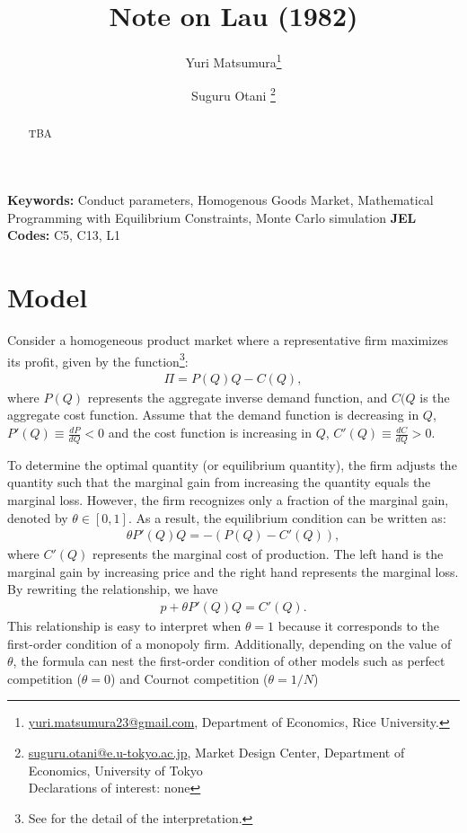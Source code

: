 \documentclass[11pt, a4paper]{article}
\title{Note on Lau (1982)}
\author{Yuri Matsumura\thanks{\href{mailto:}{yuri.matsumura23@gmail.com}, Department of Economics, Rice University.} \and Suguru Otani \thanks{\href{mailto:}{suguru.otani@e.u-tokyo.ac.jp}, Market Design Center, Department of Economics, University of Tokyo
\\Declarations of interest: none %
}}
\theoremstyle{remark}
\begin{document}
\maketitle
\begin{abstract}
    TBA
\end{abstract}

\noindent\textbf{Keywords:} Conduct parameters, Homogenous Goods Market, Mathematical Programming with Equilibrium Constraints, Monte Carlo simulation
\vspace{0in}
\newline
\noindent\textbf{JEL Codes:} C5, C13, L1

\bigskip

\section{Model}
Consider a homogeneous product market where a representative firm maximizes its profit, given by the function\footnote{See \citet{adachiMicrofoundation2023} for the detail of the interpretation.}:
\begin{align}
    \Pi = P(Q)Q - C(Q),
\end{align}
where $P(Q)$ represents the aggregate inverse demand function, and $C(Q$ is the aggregate cost function.
Assume that the demand function is decreasing in $Q$, $P'(Q) \equiv \frac{dP}{dQ} < 0$ and the cost function is increasing in $Q$, $C'(Q) \equiv \frac{dC}{dQ} > 0$.

To determine the optimal quantity (or equilibrium quantity), the firm adjusts the quantity such that the marginal gain from increasing the quantity equals the marginal loss. 
However, the firm recognizes only a fraction of the marginal gain, denoted by $\theta \in [0,1]$. 
As a result, the equilibrium condition can be written as:
\begin{align}
    \theta P'(Q)Q = - (P(Q) - C'(Q)),
\end{align}
where $C'(Q)$ represents the marginal cost of production.
The left hand is the marginal gain by increasing price and the right hand represents the marginal loss.
By rewriting the relationship, we have
\begin{align}
    p + \theta P'(Q)Q = C'(Q). \label{eq:optimality_conditition}
\end{align}
This relationship is easy to interpret when $\theta = 1$ because it corresponds to the first-order condition of a monopoly firm.
Additionally, depending on the value of $\theta$, the formula can nest the first-order condition of other models such as perfect competition ($\theta=0$) and Cournot competition ($\theta=1/N$) 
\end{document}

